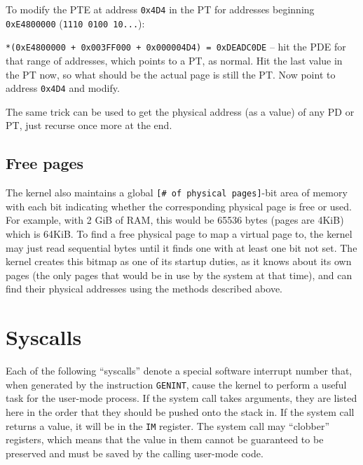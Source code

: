 \documentclass[12pt,a4paper]{report}
\begin{document}
To modify the PTE at address \texttt{0x4D4} in the PT for addresses beginning \texttt{0xE4800000} (\texttt{1110 0100 10...}):

\texttt{*(0xE4800000 + 0x003FF000 + 0x000004D4) = 0xDEADC0DE} -- hit the PDE for that range of addresses, which points to a PT, as normal. Hit the last value in the PT now, so what should be the actual page is still the PT. Now point to address \texttt{0x4D4} and modify.

The same trick can be used to get the physical address (as a value) of any PD or PT, just recurse once more at the end.

\subsection*{Free pages} \label{kfreephys}
The kernel also maintains a global \texttt{[\# of physical pages]}-bit area of memory with each bit indicating whether the corresponding physical page is free or used. For example, with 2 GiB of RAM, this would be 65536 bytes (pages are 4KiB) which is 64KiB. To find a free physical page to map a virtual page to, the kernel may just read sequential bytes until it finds one with at least one bit not set. The kernel creates this bitmap as one of its startup duties, as it knows about its own pages (the only pages that would be in use by the system at that time), and can find their physical addresses using the methods described above.


\section{Syscalls}

Each of the following ``syscalls'' denote a special software interrupt number that, when generated by the instruction \texttt{GENINT}, cause the kernel to perform a useful task for the user-mode process. If the system call takes arguments, they are listed here in the order that they should be pushed onto the stack in. If the system call returns a value, it will be in the \texttt{IM} register. The system call may ``clobber'' registers, which means that the value in them cannot be guaranteed to be preserved and must be saved by the calling user-mode code.
\end{document}
